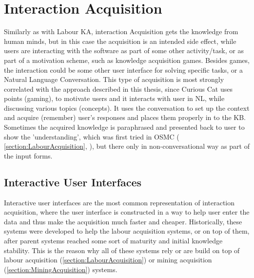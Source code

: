\section{Interaction Acquisition}
Similarly as with Labour KA, interaction Acquisition gets the knowledge from 
human minds, but in this case the acquisition is an intended side effect, while
users are interacting with the software as part of some other activity/task, or
as part of a motivation scheme, such as knowledge acquisition games. Besides 
games, the interaction could be some other user interface for solving specific
tasks, or a Natural Language Conversation. This type of acquisition is most 
strongly correlated with the approach described in this thesis, since Curious 
Cat uses points (gaming), to motivate users and it interacts with user in NL, 
while discussing various topics (concepts). It uses the conversation to set up
the context and acquire (remember) user's responses and places them properly in
to the KB. Sometimes the acquired knowledge is paraphrased and presented back to
user to show the 'understanding', which was first tried in OSMC (
\autoref{section:LabourAcquisition}, \parencite{Singh2002b}), but there only in
non-conversational way as part of the input forms.
 
\subsection{Interactive User Interfaces}
Interactive user interfaces are the most common representation of interaction 
acquisition, where the user interface is constructed in a way to help user enter
the data and thus make the acquisition much faster and cheaper. Historically, 
these systems were developed to help the labour acquisition systems, or on top
of them, after parent systems reached some sort of maturity and initial 
knowledge stability. This is the reason why all of these systems rely or are 
build on top of labour acquisition (\autoref{section:LabourAcquisition}) or 
mining acquisition (\autoref{section:MiningAcquisition}) systems.

